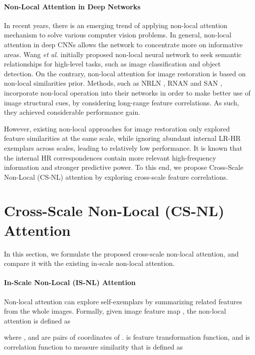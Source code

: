 \documentclass[10pt,twocolumn,letterpaper]{article}
\begin{document}
\paragraph{Non-Local Attention in Deep Networks}
In recent years, there is an emerging trend of applying non-local attention mechanism to solve various computer vision problems. In general, non-local attention in deep CNNs allows the network to concentrate more on informative areas. Wang \textit{et al.} \cite{wang2018non} initially proposed non-local neural network to seek semantic relationships for high-level tasks, such as image classification and object detection. On the contrary, non-local attention for image restoration is based on non-local similarities prior. Methods, such as NRLN \cite{liu2018non}, RNAN \cite{zhang2018image} and SAN \cite{dai2019second}, incorporate non-local operation into their networks in order to make better use of image structural cues, by considering long-range feature correlations. As such, they achieved considerable performance gain.

However, existing non-local approaches for image restoration only explored feature similarities at the same scale, while ignoring abundant internal LR-HR exemplars across scales, leading to relatively low performance. It is known that the internal HR correspondences contain more relevant high-frequency information and stronger predictive power. To this end, we propose Cross-Scale Non-Local (CS-NL) attention by exploring cross-scale feature correlations. 


 \section{Cross-Scale Non-Local (CS-NL) Attention}\label{sec:csnl}

In this section, we formulate the proposed cross-scale non-local attention, and compare it with the existing in-scale non-local attention. 
\paragraph{In-Scale Non-Local (IS-NL) Attention}
Non-local attention can explore self-exemplars by summarizing related features from the whole images.
Formally, given image feature map , the non-local attention is defined as

where ,  and  are pairs of coordinates of .  is feature transformation function, and  is correlation function to measure similarity that is defined as
\end{document}
